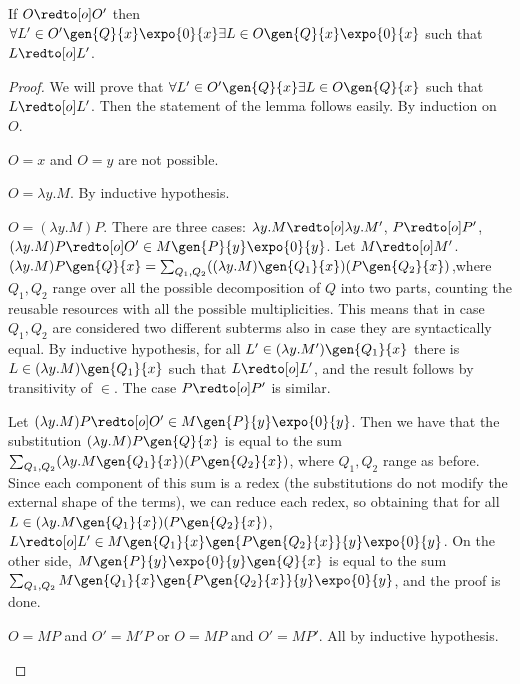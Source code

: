 \begin{lemma} \label{lem:triangolo}
If $O \redto[o] O'$ then
$\forall L' \in O'\gen{Q}{x}\expo{0}{x}
\exists L \in O\gen{Q}{x}\expo{0}{x}$
such that $L \redto[o] L'$.
\end{lemma}
\begin{proof}
We will prove that $\forall L' \in O'\gen{Q}{x}
\exists L \in O\gen{Q}{x}$
such that $L \redto[o] L'$. Then the statement of the lemma follows easily.
By induction on $O$. 
\begin{enumcases}
\item $O=x$ and $O=y$ are not possible.
\item $O=\lambda y.M$.
By inductive hypothesis.
\item $O=(\lambda y.M)P$.
There are three cases: $\lambda y.M  \redto[o]  \lambda y.M'$, $ P \redto[o] P'$,
$(\lambda y.M)P \redto[o] O' \in M\gen{P}{y}\expo{0}{y}$.
Let $M  \redto[o]  M'$.
$(\lambda y.M)P \gen{Q}{x}= \sum_{Q_{1},Q_{2}}((\lambda y.M) \gen{Q_{1}}{x})(P\gen{Q_{2}}{x})$,where
$Q_{1},Q_{2}$ range over all the possible decomposition of $Q$ into two parts, counting the reusable resources
with all the possible multiplicities. This means that in case $Q_{1},Q_{2}$ are considered two different subterms also
in case they are syntactically equal.
By inductive hypothesis, for all $L' \in (\lambda y.M') \gen{Q_{1}}{x}$ there is
$L \in (\lambda y.M) \gen{Q_{1}}{x}$ such that $L \redto[o] L'$, and the result follows by transitivity of $\in$.
The case $ P \redto[o] P'$ is similar.

Let $(\lambda y.M)P \redto[o] O' \in M\gen{P}{y}\expo{0}{y}$.
Then we have that the substitution $(\lambda y.M)P\gen{Q}{x}$ is equal to the sum $\sum_{Q_{1},Q_{2}}(\lambda y.M \gen{Q_{1}}{x}) (P\gen{Q_{2}}{x}) $, where
$Q_{1},Q_{2}$ range as before. Since each component of this sum is a redex (the substitutions do not modify the
external shape of the terms), we can reduce each redex, so obtaining that for all
$L\in (\lambda y.M \gen{Q_{1}}{x}) (P\gen{Q_{2}}{x})$, $L \redto[o] L' \in M  \gen{Q_{1}}{x}
\gen{P\gen{Q_{2}}{x}}{y} \expo{0}{y}$.
On the other side, $M\gen{P}{y}\expo{0}{y}\gen{Q}{x}$ is equal to the sum
$\sum_{Q_{1},Q_{2}}M \gen{Q_{1}}{x}
\gen{P\gen{Q_{2}}{x}}{y} \expo{0}{y} $, and the proof is done.



\item $O=MP$ and $O'= M'P$ or $O=MP$ and $O'= MP'$.
All by inductive hypothesis.\qedhere
\end{enumcases}


\end{proof}

